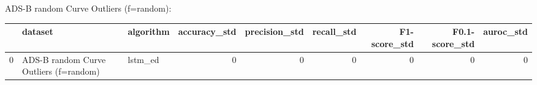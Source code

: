 ADS-B random Curve Outliers (f=random):

\begin{tabular}{rllrrrrrr}
\hline
    & dataset                                & algorithm   &   accuracy\_std &   precision\_std &   recall\_std &   F1-score\_std &   F0.1-score\_std &   auroc\_std \\
\hline
  0 & ADS-B random Curve Outliers (f=random) & lstm\_ed     &              0 &               0 &            0 &              0 &                0 &           0 \\
\hline
\end{tabular}


